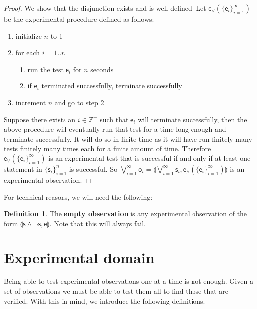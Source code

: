 \documentclass[review]{elsarticle}
\theoremstyle{plain}%
\theoremstyle{definition}
\newtheorem{defn}{Definition}[section]
\theoremstyle{remark}
\begin{document}
\begin{proof}
	We show that the disjunction exists and is well defined. Let $\mathsf{e}_\vee(\{\mathsf{e}_i\}_{i=1}^{\infty})$ be the experimental procedure defined as follows:
	\begin{enumerate}
	\item initialize $n$ to 1
	\item for each $i=1..n$
	\begin{enumerate}
		\item run the test $\mathsf{e}_i$ for $n$ seconds
		\item if $\mathsf{e}_i$ terminated successfully, terminate successfully
	\end{enumerate}
	\item increment $n$ and go to step 2
	\end{enumerate}
	Suppose there exists an $i \in \mathbb{Z}^+$ such that $\mathsf{e}_i$ will terminate successfully, then the above procedure will eventually run that test for a time long enough and terminate successfully. It will do so in finite time as it will have run finitely many tests finitely many times each for a finite amount of time. Therefore $\mathsf{e}_\vee(\{\mathsf{e}_i\}_{i=1}^{\infty})$ is an experimental test that is successful if and only if at least one statement in $\{\mathsf{s}_i\}_{i=1}^{n}$ is successful. So $\bigvee\limits_{i=1}^{\infty} \mathsf{o}_i =\llparenthesis\bigvee\limits_{i=1}^{\infty} \mathsf{s}_i, \mathsf{e}_{\wedge}(\{\mathsf{e}_i\}_{i=1}^{\infty})\rrparenthesis$ is an experimental observation.
\end{proof}



For technical reasons, we will need the following: 

\begin{defn}
The \textbf{empty observation} is any experimental observation of the form $\llparenthesis \mathsf{s}\wedge \neg\mathsf{s},\mathsf{e}\rrparenthesis$. Note that this will always fail. 
\end{defn}



\section{Experimental domain}

Being able to test experimental observations one at a time is not enough. Given a set of observations we must be able to test them all to find those that are verified. With this in mind, we introduce the following definitions.
\end{document}
